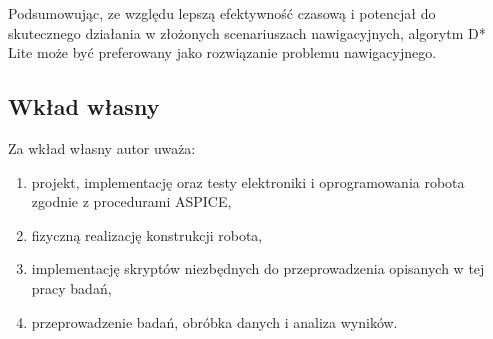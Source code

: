 \documentclass[12pt,twoside]{article}
\begin{document}
Podsumowując, ze względu lepszą efektywność czasową i potencjał do skutecznego działania w złożonych scenariuszach nawigacyjnych, algorytm D* Lite może być preferowany jako rozwiązanie problemu nawigacyjnego.

\subsection{Wkład własny}
Za wkład własny autor uważa:
\begin{enumerate}[label=\alph*), leftmargin=1.25cm]
\item projekt, implementację oraz testy elektroniki i oprogramowania robota zgodnie z procedurami ASPICE,
\item fizyczną realizację konstrukcji robota,
\item implementację skryptów niezbędnych do przeprowadzenia opisanych w tej pracy badań,
\item przeprowadzenie badań, obróbka danych i analiza wyników.
\end{enumerate}


\clearpage

\end{document}
